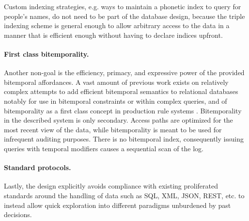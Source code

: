 Custom indexing strategies, e.g. ways to maintain a phonetic index to query for people's names, do not need to be part of the database design, because the triple indexing scheme is general enough to allow arbitrary access to the data in a manner that is efficient enough without having to declare indices upfront.

\paragraph{First class bitemporality.}
Another non-goal is the efficiency, primacy, and expressive power of the provided bitemporal affordances. A vast amount of previous work exists on relatively complex attempts to add efficient bitemporal semantics to relational databases \cite{snodgrass1996adding,jensen1999temporal,kulkarni2012temporal} notably for use in bitemporal constraints \cite{doucet1997using} or within complex queries, and of bitemporality as a first class concept in production rule systems \cite{aref2015design}. Bitemporality in the described system is only secondary. Access paths are optimized for the most recent view of the data, while bitemporality is meant to be used for infrequent auditing purposes. There is no bitemporal index, consequently issuing queries with temporal modifiers causes a sequential scan of the log.

\paragraph{Standard protocols.}
Lastly, the design explicitly avoids compliance with existing proliferated standards around the handling of data such as SQL, \gls{XML}, \gls{JSON}, \gls{REST}, etc. to instead allow quick exploration into different paradigms unburdened by past decisions.
